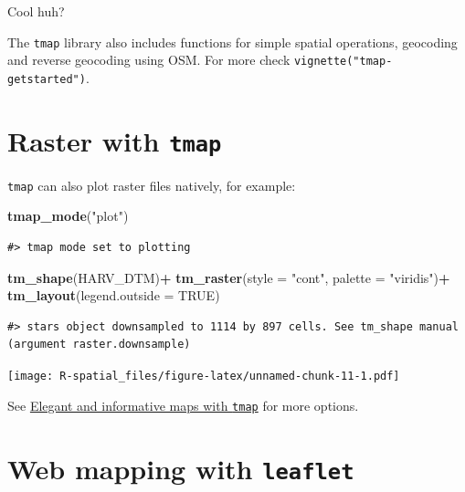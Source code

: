 \documentclass[
]{book}
\newenvironment{Shaded}{\begin{snugshade}}{\end{snugshade}}
\newcommand{\AttributeTok}[1]{\textcolor[rgb]{0.13,0.29,0.53}{#1}}
\newcommand{\ConstantTok}[1]{\textcolor[rgb]{0.56,0.35,0.01}{#1}}
\newcommand{\FunctionTok}[1]{\textcolor[rgb]{0.13,0.29,0.53}{\textbf{#1}}}
\newcommand{\NormalTok}[1]{#1}
\newcommand{\SpecialCharTok}[1]{\textcolor[rgb]{0.81,0.36,0.00}{\textbf{#1}}}
\newcommand{\StringTok}[1]{\textcolor[rgb]{0.31,0.60,0.02}{#1}}
\begin{document}
Cool huh?

The \texttt{tmap} library also includes functions for simple spatial operations, geocoding and reverse geocoding using OSM. For more check \texttt{vignette("tmap-getstarted")}.

\hypertarget{raster-with-tmap}{%
\section{\texorpdfstring{Raster with \texttt{tmap}}{Raster with tmap}}\label{raster-with-tmap}}

\texttt{tmap} can also plot raster files natively, for example:

\begin{Shaded}
\begin{Highlighting}[]
\FunctionTok{tmap\_mode}\NormalTok{(}\StringTok{"plot"}\NormalTok{)}
\end{Highlighting}
\end{Shaded}

\begin{verbatim}
#> tmap mode set to plotting
\end{verbatim}

\begin{Shaded}
\begin{Highlighting}[]
\FunctionTok{tm\_shape}\NormalTok{(HARV\_DTM)}\SpecialCharTok{+}
    \FunctionTok{tm\_raster}\NormalTok{(}\AttributeTok{style =} \StringTok{"cont"}\NormalTok{, }\AttributeTok{palette =} \StringTok{"viridis"}\NormalTok{)}\SpecialCharTok{+}
    \FunctionTok{tm\_layout}\NormalTok{(}\AttributeTok{legend.outside =} \ConstantTok{TRUE}\NormalTok{)}
\end{Highlighting}
\end{Shaded}

\begin{verbatim}
#> stars object downsampled to 1114 by 897 cells. See tm_shape manual (argument raster.downsample)
\end{verbatim}

\texttt{[image: R-spatial\_files/figure-latex/unnamed-chunk-11-1.pdf]}

See \href{https://r-tmap.github.io/tmap-book/}{Elegant and informative maps with \texttt{tmap}} for more options.

\hypertarget{web-mapping-with-leaflet}{%
\section{\texorpdfstring{Web mapping with \texttt{leaflet}}{Web mapping with leaflet}}\label{web-mapping-with-leaflet}}
\end{document}

